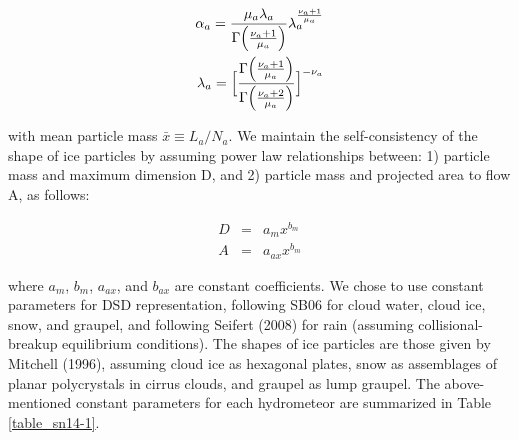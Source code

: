 \begin{eqnarray}
\alpha_{a}=\frac{\mu_{a}\lambda_{a}}{\Gamma\Bigl(\frac{\nu_{a}+1}{\mu_{a}}\Bigr)}\lambda_{a}^{\frac{\nu_{a}+1}{\mu_{a}}}\\
\label{sn9}
\lambda_{a}=\Bigl[\frac{\Gamma\Bigl(\frac{\nu_{a}+1}{\mu_{a}}\Bigr)}{\Gamma\Bigl(\frac{\nu_{a}+2}{\mu_{a}}\Bigr)}\Bigr]^{-\nu_{a}}\nonumber
\end{eqnarray}

with mean particle mass $\bar{x}\equiv L_{a}/N_{a}$. We maintain the self-consistency of the shape of ice particles by assuming power law relationships between: 1) particle mass and maximum dimension D, and 2) particle mass and projected area to flow A, as follows:

\begin{eqnarray}
D&=&a_{m}x^{b_{m}}\\
\label{sn10}
A&=&a_{ax}x^{b_{m}}
\label{sn11}
\end{eqnarray}

where $a_{m}$, $b_{m}$, $a_{ax}$, and $b_{ax}$ are constant coefficients. We chose to use constant parameters for DSD representation, following SB06 for cloud water, cloud ice, snow, and graupel, and following Seifert (2008) for rain (assuming collisional-breakup equilibrium conditions). The shapes of ice particles are those given by Mitchell (1996), assuming cloud ice as hexagonal plates, snow as assemblages of planar polycrystals in cirrus clouds, and graupel as lump graupel. The above-mentioned constant parameters for each hydrometeor are summarized in Table \ref{table_sn14-1}.

